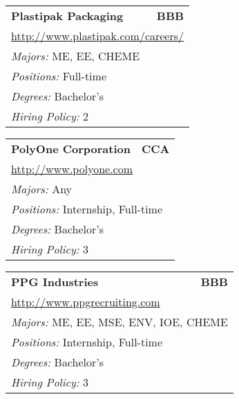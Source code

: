 \documentclass[twoside]{article}
\begin{document}
\begin{center}
\begin{multicols}{3}
\begin{FlushLeft}
\begin{minipage}{.9\columnwidth}
\end{minipage}
 
\begin{minipage}{.9\columnwidth}\begin{tabularx}{.95\columnwidth}{Xr}
                 {\Large\bf Plastipak Packaging} & {\Large\bf BBB}\\
    \multicolumn{2}{p{.95\columnwidth}}{\url{http://www.plastipak.com/careers/}}\\
    \multicolumn{2}{p{.95\columnwidth}}{\emph{Majors:} ME, EE, CHEME}\\
    \multicolumn{2}{p{.95\columnwidth}}{\emph{Positions:} Full-time}\\
    \multicolumn{2}{p{.95\columnwidth}}{\emph{Degrees:} Bachelor's}\\
    \multicolumn{2}{p{.95\columnwidth}}{\emph{Hiring Policy:} 2}\\
    \end{tabularx}
    
\end{minipage}
 
\begin{minipage}{.9\columnwidth}\begin{tabularx}{.95\columnwidth}{Xr}
                 {\Large\bf PolyOne Corporation} & {\Large\bf CCA}\\
    \multicolumn{2}{p{.95\columnwidth}}{\url{http://www.polyone.com}}\\
    \multicolumn{2}{p{.95\columnwidth}}{\emph{Majors:} Any}\\
    \multicolumn{2}{p{.95\columnwidth}}{\emph{Positions:} Internship, Full-time}\\
    \multicolumn{2}{p{.95\columnwidth}}{\emph{Degrees:} Bachelor's}\\
    \multicolumn{2}{p{.95\columnwidth}}{\emph{Hiring Policy:} 3}\\
    \end{tabularx}
    
\end{minipage}
 
\begin{minipage}{.9\columnwidth}\begin{tabularx}{.95\columnwidth}{Xr}
                 {\Large\bf PPG Industries} & {\Large\bf BBB}\\
    \multicolumn{2}{p{.95\columnwidth}}{\url{http://www.ppgrecruiting.com}}\\
    \multicolumn{2}{p{.95\columnwidth}}{\emph{Majors:} ME, EE, MSE, ENV, IOE, CHEME}\\
    \multicolumn{2}{p{.95\columnwidth}}{\emph{Positions:} Internship, Full-time}\\
    \multicolumn{2}{p{.95\columnwidth}}{\emph{Degrees:} Bachelor's}\\
    \multicolumn{2}{p{.95\columnwidth}}{\emph{Hiring Policy:} 3}\\
    \end{tabularx}
    

\end{minipage}
\end{FlushLeft}
\end{multicols}
\end{center}
\end{document}
